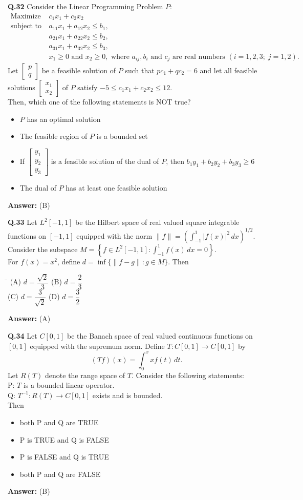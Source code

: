 \documentclass[11pt,a4paper]{article}
\newcommand{\optsfourA}[4]{%
  \begin{tabbing}
    \hspace{0.48\linewidth}\=\kill
    (A) #1 \> (B) #2 \\[2pt]
    (C) #3 \> (D) #4
  \end{tabbing}%
}
\newcommand{\optslistA}[4]{%
  \begin{itemize}
    \setlength{\itemsep}{2pt}\setlength{\parskip}{0pt}
    \item[(A)] #1
    \item[(B)] #2
    \item[(C)] #3
    \item[(D)] #4
  \end{itemize}%
}
\newcommand{\ans}[1]{\textbf{Answer:} #1\par\medskip}
\begin{document}
\textbf{Q.32} Consider the Linear Programming Problem $P$:
\begin{align*}
  \text{Maximize } & c_1 x_1 + c_2 x_2 \\
  \text{subject to } & a_{11} x_1 + a_{12} x_2 \le b_1, \\
                     & a_{21} x_1 + a_{22} x_2 \le b_2, \\
                     & a_{31} x_1 + a_{32} x_2 \le b_3, \\
                     & x_1 \ge 0 \text{ and } x_2 \ge 0, \text{ where } a_{ij}, b_i \text{ and } c_j \text{ are real numbers } (i = 1, 2, 3;\; j = 1, 2).
\end{align*}
Let $\begin{bmatrix} p \\ q \end{bmatrix}$ be a feasible solution of $P$ such that $p c_1 + q c_2 = 6$ and let all feasible solutions $\begin{bmatrix} x_1 \\ x_2 \end{bmatrix}$ of $P$ satisfy $-5 \le c_1 x_1 + c_2 x_2 \le 12$.\\
Then, which one of the following statements is NOT true?
\optslistA{$P$ has an optimal solution}{The feasible region of $P$ is a bounded set}{If $\begin{bmatrix} y_1 \\ y_2 \\ y_3 \end{bmatrix}$ is a feasible solution of the dual of $P$, then $b_1 y_1 + b_2 y_2 + b_3 y_3 \ge 6$}{The dual of $P$ has at least one feasible solution}
\ans{(B)}

\textbf{Q.33} Let $L^2[-1, 1]$ be the Hilbert space of real valued square integrable functions on $[-1, 1]$ equipped with the norm $\|f\| = \left(\int_{-1}^{1} |f(x)|^2\,dx\right)^{1/2}$.\\
Consider the subspace $M = \left\{f \in L^2[-1, 1] : \int_{-1}^{1} f(x)\,dx = 0\right\}$.\\
For $f(x) = x^2$, define $d = \inf\{\|f - g\| : g \in M\}$. Then
\optsfourA{$d = \dfrac{\sqrt{2}}{3}$}{$d = \dfrac{2}{3}$}{$d = \dfrac{3}{\sqrt{2}}$}{$d = \dfrac{3}{2}$}
\ans{(A)}

\textbf{Q.34} Let $C[0, 1]$ be the Banach space of real valued continuous functions on $[0, 1]$ equipped with the supremum norm. Define $T : C[0, 1] \to C[0, 1]$ by
\[
  (Tf)(x) = \int_0^x x f(t)\,dt.
\]
Let $R(T)$ denote the range space of $T$. Consider the following statements:\\
P: $T$ is a bounded linear operator.\\
Q: $T^{-1} : R(T) \to C[0, 1]$ exists and is bounded.\\
Then
\optslistA{both P and Q are TRUE}{P is TRUE and Q is FALSE}{P is FALSE and Q is TRUE}{both P and Q are FALSE}
\ans{(B)}
\end{document}
